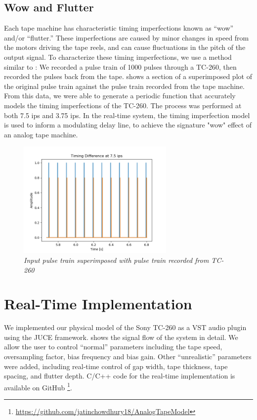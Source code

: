\documentclass[twoside,a4paper]{article}
\begin{document}
\subsection{Wow and Flutter}
Each tape machine has characteristic timing imperfections
known as ``wow'' and/or ``flutter.'' These imperfections
are caused by minor changes in speed from the motors
driving the tape reels, and can cause fluctuations in
the pitch of the output signal. To characterize these
timing imperfections, we use a method similar to \cite{tapeDelay}:
We recorded a pulse train of 1000 pulses through a TC-260,
then recorded the pulses back from the tape. 
shows a section of a superimposed plot of the original
pulse train against the pulse train recorded from the tape
machine. From this data, we were able to generate a periodic
function that accurately models the timing imperfections of
the TC-260. The process was performed at both 7.5 ips and 3.75
ips. In the real-time system, the timing imperfection model
is used to inform a modulating delay line, to achieve the
signature "wow" effect of an analog tape machine.

\begin{figure}[ht]
    \center
    \includegraphics[width=3in]{../Simulations/TimingEffects/timing_diff_7-5.png}
    \caption{\label{timingSim}{\it Input pulse train superimposed with pulse train recorded from TC-260}}
\end{figure}
%

\section{Real-Time Implementation}
We implemented our physical model of the Sony TC-260 as a
VST audio plugin using the JUCE framework. 
shows the signal flow of the system in detail. We allow the user
to control ``normal'' parameters including the tape speed,
oversampling factor, bias frequency and bias gain.
Other ``unrealistic'' parameters were added, including
real-time control of gap width, tape thickness, tape spacing,
and flutter depth. C/C++ code for the real-time implementation
is available on GitHub
\footnote{\url{https://github.com/jatinchowdhury18/AnalogTapeModel}}.
\end{document}
